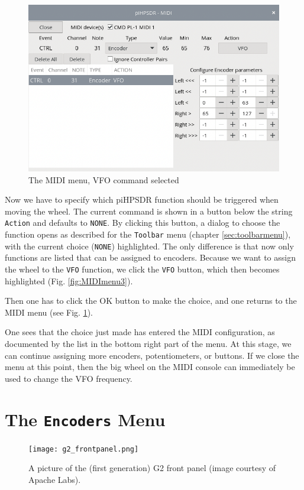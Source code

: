 \documentclass[12pt]{book}
\def\rett#1{\texttt{\color{red}#1}}
\def\bltt#1{\texttt{\color{blue}#1}}
\def\pH{pi\-HPSDR\xspace}
\begin{document}
\begin{figure}[ht!]
\center
\includegraphics[scale=0.45]{MIDImenu4.png}
\caption{The MIDI menu, VFO command selected}
\label{fig:MIDImenu4}
\end{figure}
Now we have to specify which \pH function should be triggered when moving the wheel.
The current command is shown in a button below the string \rett{Action} and defaults to \bltt{NONE}.
By clicking this button, a dialog to choose the function opens as described for the
\bltt{Toolbar} menu (chapter \ref{sec:toolbarmenu}), with the current choice (\bltt{NONE})
highlighted. The only difference is that now only functions are listed that can be
assigned to encoders.
Because we want to assign the wheel to the \bltt{VFO} function, we click
the \bltt{VFO} button, which then becomes highlighted (Fig. \ref{fig:MIDImenu3}).



Then one has to click the OK button to make the choice, and one returns to the
MIDI menu (see Fig. \ref{fig:MIDImenu4}).

One sees that the choice just made has entered the MIDI configuration, as documented by the
list in the bottom right part of the menu. At this stage, we can continue
assigning more encoders, potentiometers, or buttons. If we close the menu at
this point, then the big wheel on the MIDI console can immediately be used
to change the VFO frequency.

\section{The \texttt{Encoders} Menu}
\begin{figure}[ht!]
\center
\texttt{[image: g2\_frontpanel.png]}
\caption{A picture of the (first generation) G2 front panel (image courtesy of Apache Labs).}
\label{fig:g2_frontpanel}
\end{figure}
\end{document}
